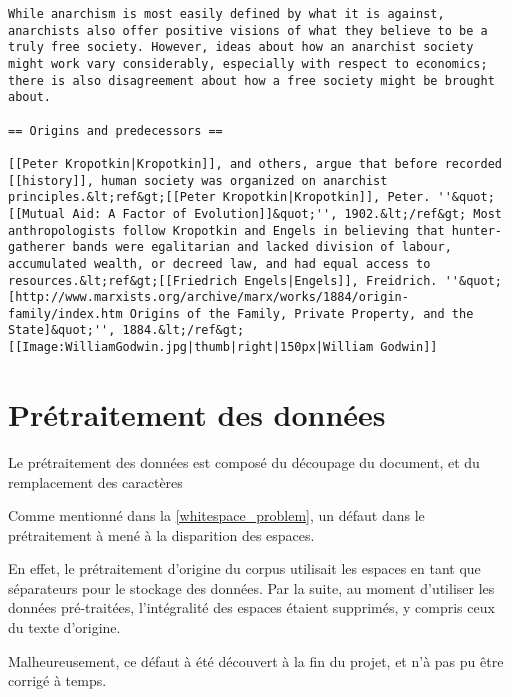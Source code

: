 \begin{lstlisting}[caption={Extrait des premières lignes du fichier enwik8, correspondant à l'article sur l'ansarchisme.},label=enwik8_ex]
While anarchism is most easily defined by what it is against, anarchists also offer positive visions of what they believe to be a truly free society. However, ideas about how an anarchist society might work vary considerably, especially with respect to economics; there is also disagreement about how a free society might be brought about. 

== Origins and predecessors ==

[[Peter Kropotkin|Kropotkin]], and others, argue that before recorded [[history]], human society was organized on anarchist principles.&lt;ref&gt;[[Peter Kropotkin|Kropotkin]], Peter. ''&quot;[[Mutual Aid: A Factor of Evolution]]&quot;'', 1902.&lt;/ref&gt; Most anthropologists follow Kropotkin and Engels in believing that hunter-gatherer bands were egalitarian and lacked division of labour, accumulated wealth, or decreed law, and had equal access to resources.&lt;ref&gt;[[Friedrich Engels|Engels]], Freidrich. ''&quot;[http://www.marxists.org/archive/marx/works/1884/origin-family/index.htm Origins of the Family, Private Property, and the State]&quot;'', 1884.&lt;/ref&gt;
[[Image:WilliamGodwin.jpg|thumb|right|150px|William Godwin]]
\end{lstlisting}

\section{Prétraitement des données}
Le prétraitement des données est composé du découpage du document, et du remplacement des caractères

Comme mentionné dans la \autoref{whitespace_problem}, un défaut dans le prétraitement à mené à la disparition des espaces.

En effet, le prétraitement d'origine du corpus utilisait les espaces en tant que séparateurs pour le stockage des données. Par la suite, au moment d'utiliser les données pré-traitées, l'intégralité des espaces étaient supprimés, y compris ceux du texte d'origine.

Malheureusement, ce défaut à été découvert à la fin du projet, et n'à pas pu être corrigé à temps.
